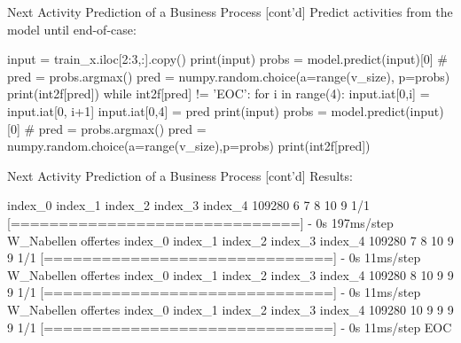 \documentclass[ignorenonframetext,xcolor=x11names]{beamer}
\begin{document}
\begin{frame}[label=withcode,fragile]{Next Activity Prediction of a Business Process \small [cont'd]}
Predict activities from the model until end-of-case:
\begin{pythoncode}
input = train_x.iloc[2:3,:].copy()
print(input)
probs = model.predict(input)[0]
# pred = probs.argmax()
pred = numpy.random.choice(a=range(v_size), p=probs)
print(int2f[pred])
while int2f[pred] != 'EOC':
    for i in range(4):
        input.iat[0,i] = input.iat[0, i+1]
    input.iat[0,4] = pred
    print(input)
    probs = model.predict(input)[0]
    # pred = probs.argmax()
    pred = numpy.random.choice(a=range(v_size),p=probs)
    print(int2f[pred])
\end{pythoncode}
\end{frame}


\begin{frame}[label=withcode,fragile]{Next Activity Prediction of a Business Process \small [cont'd]}
Results:
\begin{textcode}
       index_0  index_1  index_2  index_3  index_4
109280        6        7        8       10        9
1/1 [==============================] - 0s 197ms/step
W_Nabellen offertes
        index_0  index_1  index_2  index_3  index_4
109280        7        8       10        9        9
1/1 [==============================] - 0s 11ms/step
W_Nabellen offertes
        index_0  index_1  index_2  index_3  index_4
109280        8       10        9        9        9
1/1 [==============================] - 0s 11ms/step
W_Nabellen offertes
        index_0  index_1  index_2  index_3  index_4
109280       10        9        9        9        9
1/1 [==============================] - 0s 11ms/step
EOC
\end{textcode}
\end{frame}


\end{document}

